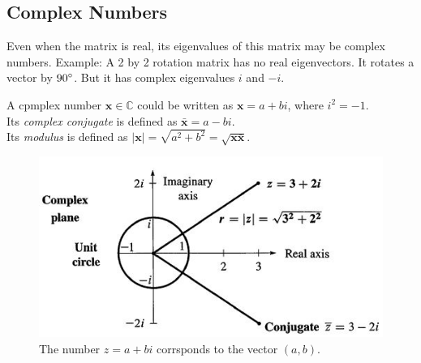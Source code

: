\subsection{Complex Numbers}
Even when the matrix is real, its eigenvalues of this matrix may be complex numbers. Example: A 2 by 2
rotation matrix has no real eigenvectors. It rotates a vector by $90^\circ$. But it has complex eigenvalues $i$ and $-i$.
\begin{definition}
A cpmplex number $\bm x\in\mathbb{C}$ could be written as $\bm x=a+bi$, where $i^2=-1$.\\
Its \emph{complex conjugate} is defined as $\bm{\bar x}=a-bi$.\\
Its \emph{modulus} is defined as $|\bm x|=\sqrt{a^2+b^2}=\sqrt{\bm x\bm{\bar x}}.$
\end{definition}
\begin{figure}[H]
\centering\includegraphics{week6/complex}
\caption{The number $z=a+bi$ corrsponds to the vector 
$(a,b)$.}
\end{figure}
